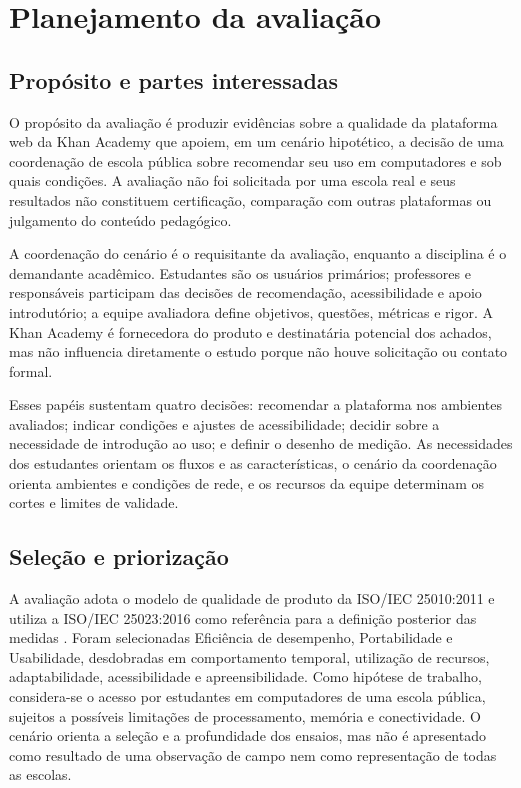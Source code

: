 \section{Planejamento da avaliação}

\subsection{Propósito e partes interessadas}

O propósito da avaliação é produzir evidências sobre a qualidade da
plataforma web da Khan Academy que apoiem, em um cenário hipotético, a
decisão de uma coordenação de escola pública sobre recomendar seu uso
em computadores e sob quais condições. A avaliação não foi solicitada
por uma escola real e seus resultados não constituem certificação,
comparação com outras plataformas ou julgamento do conteúdo
pedagógico.

A coordenação do cenário é o requisitante da avaliação, enquanto a
disciplina é o demandante acadêmico. Estudantes são os usuários
primários; professores e responsáveis participam das decisões de
recomendação, acessibilidade e apoio introdutório; a equipe avaliadora
define objetivos, questões, métricas e rigor. A Khan Academy é
fornecedora do produto e destinatária potencial dos achados, mas não
influencia diretamente o estudo porque não houve solicitação ou contato
formal.

Esses papéis sustentam quatro decisões: recomendar a plataforma nos
ambientes avaliados; indicar condições e ajustes de acessibilidade;
decidir sobre a necessidade de introdução ao uso; e definir o desenho
de medição. As necessidades dos estudantes orientam os fluxos e as
características, o cenário da coordenação orienta ambientes e condições
de rede, e os recursos da equipe determinam os cortes e limites de
validade.

\subsection{Seleção e priorização}

A avaliação adota o modelo de qualidade de produto da ISO/IEC
25010:2011 e utiliza a ISO/IEC 25023:2016 como referência para a
definição posterior das medidas \cite{iso25010_2011,iso25023_2016}.
Foram selecionadas Eficiência de desempenho, Portabilidade e
Usabilidade, desdobradas em comportamento temporal, utilização de
recursos, adaptabilidade, acessibilidade e apreensibilidade.
Como hipótese de trabalho, considera-se o acesso por estudantes em
computadores de uma escola pública, sujeitos a possíveis limitações de
processamento, memória e conectividade. O cenário orienta a seleção e a
profundidade dos ensaios, mas não é apresentado como resultado de uma
observação de campo nem como representação de todas as escolas.

